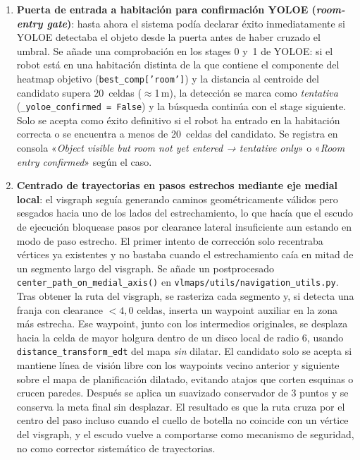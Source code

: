 \begin{enumerate}
  \item \textbf{Puerta de entrada a habitación para confirmación YOLOE (\textit{room-entry gate})}: hasta ahora el sistema podía declarar éxito
        inmediatamente si YOLOE detectaba el objeto desde la puerta antes de
        haber cruzado el umbral. Se añade una comprobación en los stages 0
        y~1 de YOLOE: si el robot está en una habitación distinta de la que
        contiene el componente del heatmap objetivo
        (\texttt{best\_comp['room']}) y la distancia al centroide del
        candidato supera 20~celdas ($\approx$1\,m), la detección se marca
        como \textit{tentativa} (\texttt{\_yoloe\_confirmed = False}) y la
        búsqueda continúa con el stage siguiente. Solo se acepta como éxito
        definitivo si el robot ha entrado en la habitación correcta o se
        encuentra a menos de 20~celdas del candidato. Se registra en consola
        «\textit{Object visible but room not yet entered → tentative only}» o
        «\textit{Room entry confirmed}» según el caso.

  \item \textbf{Centrado de trayectorias en pasos estrechos mediante eje medial local}:
        el visgraph seguía generando caminos geométricamente válidos pero
        sesgados hacia uno de los lados del estrechamiento, lo que hacía que el
        escudo de ejecución bloquease pasos por clearance lateral insuficiente
        aun estando en modo de paso estrecho. El primer intento de corrección
        solo recentraba vértices ya existentes y no bastaba cuando el
        estrechamiento caía en mitad de un segmento largo del visgraph. Se
        añade un postprocesado
        \texttt{center\_path\_on\_medial\_axis()} en
        \texttt{vlmaps/utils/navigation\_utils.py}. Tras obtener la ruta del
        visgraph, se rasteriza cada segmento y, si detecta una franja con
        clearance $<4{,}0$ celdas, inserta un waypoint auxiliar en la zona más
        estrecha. Ese waypoint, junto con los intermedios originales, se
        desplaza hacia la celda de mayor holgura dentro de un disco local de
        radio 6, usando \texttt{distance\_transform\_edt} del mapa
        \emph{sin} dilatar. El candidato solo se acepta si mantiene línea de
        visión libre con los waypoints vecino anterior y siguiente sobre el
        mapa de planificación dilatado, evitando atajos que corten esquinas o
        crucen paredes. Después se aplica un suavizado conservador de 3 puntos
        y se conserva la meta final sin desplazar. El resultado es que la ruta
        cruza por el centro del paso incluso cuando el cuello de botella no
        coincide con un vértice del visgraph, y el escudo vuelve a comportarse
        como mecanismo de seguridad, no como corrector sistemático de
        trayectorias.


\end{enumerate}
